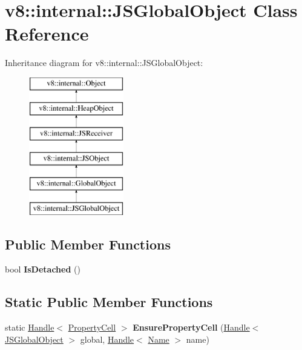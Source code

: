 \hypertarget{classv8_1_1internal_1_1_j_s_global_object}{}\section{v8\+:\+:internal\+:\+:J\+S\+Global\+Object Class Reference}
\label{classv8_1_1internal_1_1_j_s_global_object}
Inheritance diagram for v8\+:\+:internal\+:\+:J\+S\+Global\+Object\+:\begin{figure}[H]
\begin{center}
\leavevmode
\includegraphics[height=6.000000cm]{classv8_1_1internal_1_1_j_s_global_object}
\end{center}
\end{figure}
\subsection*{Public Member Functions}
\begin{DoxyCompactItemize}
\item 
\hypertarget{classv8_1_1internal_1_1_j_s_global_object_a9c78fdab942887837ce802a9f466c10f}{}bool {\bfseries Is\+Detached} ()\label{classv8_1_1internal_1_1_j_s_global_object_a9c78fdab942887837ce802a9f466c10f}

\end{DoxyCompactItemize}
\subsection*{Static Public Member Functions}
\begin{DoxyCompactItemize}
\item 
\hypertarget{classv8_1_1internal_1_1_j_s_global_object_a7c6f27e92dcf948257e161d7e1fbf931}{}static \hyperlink{classv8_1_1internal_1_1_handle}{Handle}$<$ \hyperlink{classv8_1_1internal_1_1_property_cell}{Property\+Cell} $>$ {\bfseries Ensure\+Property\+Cell} (\hyperlink{classv8_1_1internal_1_1_handle}{Handle}$<$ \hyperlink{classv8_1_1internal_1_1_j_s_global_object}{J\+S\+Global\+Object} $>$ global, \hyperlink{classv8_1_1internal_1_1_handle}{Handle}$<$ \hyperlink{classv8_1_1internal_1_1_name}{Name} $>$ name)\label{classv8_1_1internal_1_1_j_s_global_object_a7c6f27e92dcf948257e161d7e1fbf931}

\end{DoxyCompactItemize}
